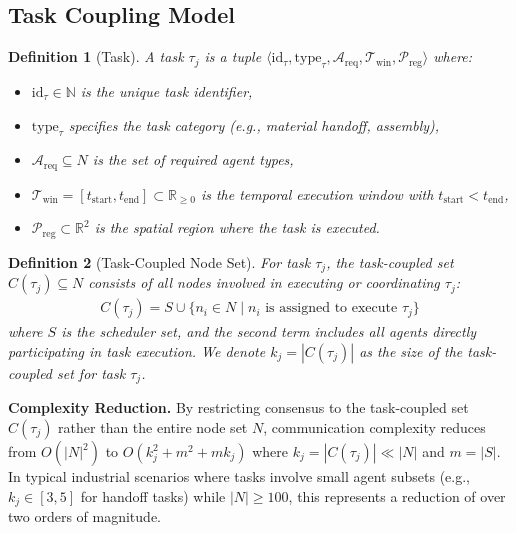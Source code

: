 \documentclass[lettersize,journal]{IEEEtran}
\newtheorem{definition}{Definition}
\begin{document}
\subsection{Task Coupling Model}

\begin{definition}[Task]
\label{def:task}
A task $\tau_j$ is a tuple $\langle \text{id}_\tau, \text{type}_\tau, 
\mathcal{A}_{\text{req}}, \mathcal{T}_{\text{win}}, \mathcal{P}_{\text{reg}} 
\rangle$ where:
\begin{itemize}
    \item $\text{id}_\tau \in \mathbb{N}$ is the unique task identifier,
    \item $\text{type}_\tau$ specifies the task category (e.g., material handoff, assembly),
    \item $\mathcal{A}_{\text{req}} \subseteq N$ is the set of required agent types,
    \item $\mathcal{T}_{\text{win}} = [t_{\text{start}}, t_{\text{end}}] 
          \subset \mathbb{R}_{\geq 0}$ is the temporal execution window with 
          $t_{\text{start}} < t_{\text{end}}$,
    \item $\mathcal{P}_{\text{reg}} \subset \mathbb{R}^2$ is the spatial 
          region where the task is executed.
\end{itemize}
\end{definition}

\begin{definition}[Task-Coupled Node Set]
\label{def:task_coupled_set}
For task $\tau_j$, the \textit{task-coupled set} $C(\tau_j) \subseteq N$ 
consists of all nodes involved in executing or coordinating $\tau_j$:
\begin{equation}
\begin{aligned}
C(\tau_j) = S \cup \{n_i \in N \mid n_i \text{ is assigned to execute } \tau_j\}
\end{aligned}
\end{equation}
where $S$ is the scheduler set, and the second term includes all agents 
directly participating in task execution. We denote $k_j = |C(\tau_j)|$ 
as the size of the task-coupled set for task $\tau_j$.
\end{definition}

\textbf{Complexity Reduction.} By restricting consensus to the task-coupled 
set $C(\tau_j)$ rather than the entire node set $N$, communication 
complexity reduces from $O(|N|^2)$ to $O(k_j^2 + m^2 + mk_j)$ where 
$k_j = |C(\tau_j)| \ll |N|$ and $m = |S|$. In typical 
industrial scenarios where tasks involve small agent subsets (e.g., 
$k_j \in [3, 5]$ for handoff tasks) while $|N| \geq 100$, this represents 
a reduction of over two orders of magnitude.
\end{document}
